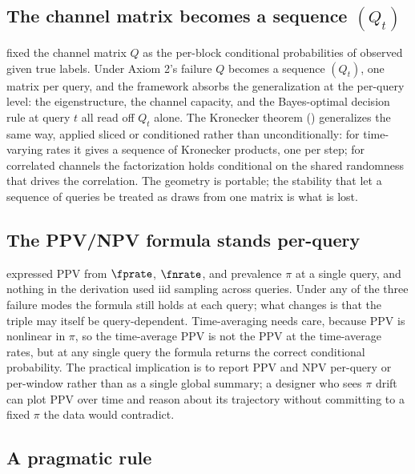 \subsection*{The channel matrix becomes a sequence $(Q_t)$}

 fixed the channel matrix $Q$ as the per-block
conditional probabilities of observed given true labels. Under Axiom 2's
failure $Q$ becomes a sequence $(Q_t)$, one matrix per query, and the
framework absorbs the generalization at the per-query level: the
eigenstructure, the channel capacity, and the Bayes-optimal decision rule
at query $t$ all read off $Q_t$ alone. The Kronecker theorem
() generalizes the same way, applied sliced or
conditioned rather than unconditionally: for time-varying rates it gives
a sequence of Kronecker products, one per step; for correlated channels
the factorization holds conditional on the shared randomness that drives
the correlation. The geometry is portable; the stability that let a
sequence of queries be treated as draws from one matrix is what is lost.

\subsection*{The PPV/NPV formula stands per-query}

 expressed PPV from $\fprate$, $\fnrate$, and prevalence
$\pi$ at a single query, and nothing in the derivation used iid sampling
across queries. Under any of the three failure modes the formula still
holds at each query; what changes is that the triple may itself be
query-dependent. Time-averaging needs care, because PPV is nonlinear in
$\pi$, so the time-average PPV is not the PPV at the time-average rates,
but at any single query the formula returns the correct conditional
probability. The practical implication is to report PPV and NPV per-query
or per-window rather than as a single global summary; a designer who sees
$\pi$ drift can plot PPV over time and reason about its trajectory
without committing to a fixed $\pi$ the data would contradict.

\subsection*{A pragmatic rule}

